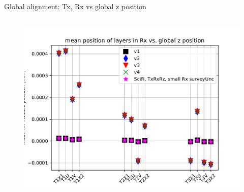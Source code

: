 \documentclass[aspectratio=1610, 12pt]{beamer}
\begin{document}
\begin{frame}{Global alignment: Tx, Rx vs global z position}
\begin{columns}
\begin{column}[c]{0.5\textwidth}
\begin{figure}
        \includegraphics[width=\textwidth]{plots/outfiles_vs_global/all_runs_retest_glob_z_vs_local_Rx.pdf}
      \end{figure}
    \end{column}
  \end{columns}
\end{frame}
\end{document}
